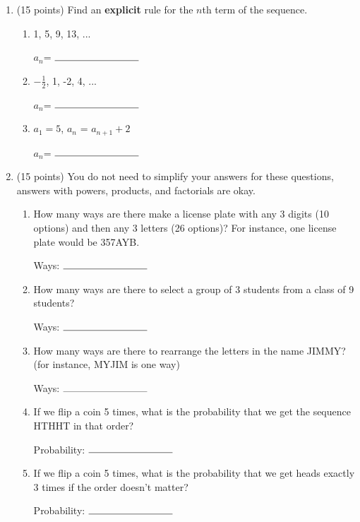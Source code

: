 \documentclass[11pt]{article}
\begin{document}
\begin{enumerate}
\item (15 points) Find an \textbf{explicit} rule for the $n$th term of the sequence.
\begin{enumerate}[itemsep=30pt, label={\alph*)}]
\item 1, 5, 9, 13, ...
\begin{flushright}
$a_n$= $\rule{3cm}{0.4pt}$
\end{flushright}
\item $-\frac{1}{2}$, 1, -2, 4, ...
\begin{flushright}
$a_n$= $\rule{3cm}{0.4pt}$
\end{flushright}
\item $a_1 = 5$, $a_n$ = $a_{n+1} +2$
\begin{flushright}
$a_n$= $\rule{3cm}{0.4pt}$
\end{flushright}
\end{enumerate}

\newpage

\item (15 points) You do not need to simplify your answers for these questions, answers with powers, products, and factorials are okay.
\begin{enumerate}[itemsep=60pt, label={\alph*)}]
\item How many ways are there make a license plate with any 3 digits (10 options) and then any 3 letters (26 options)? For instance, one license plate would be 357AYB.
\begin{flushright}
Ways: $\rule{3cm}{0.4pt}$
\end{flushright}
\item How many ways are there to select a group of 3 students from a class of 9 students?
\begin{flushright}
Ways: $\rule{3cm}{0.4pt}$
\end{flushright}
\item How many ways are there to rearrange the letters in the name JIMMY? (for instance, MYJIM is one way)
\begin{flushright}
Ways: $\rule{3cm}{0.4pt}$
\end{flushright}
\item If we flip a coin 5 times, what is the probability that we get the sequence HTHHT in that order?
\begin{flushright}
Probability: $\rule{3cm}{0.4pt}$
\end{flushright}
\item If we flip a coin 5 times, what is the probability that we get heads exactly 3 times if the order doesn't matter?
\begin{flushright}
Probability: $\rule{3cm}{0.4pt}$
\end{flushright}
\end{enumerate}


\end{enumerate}
\end{document}
